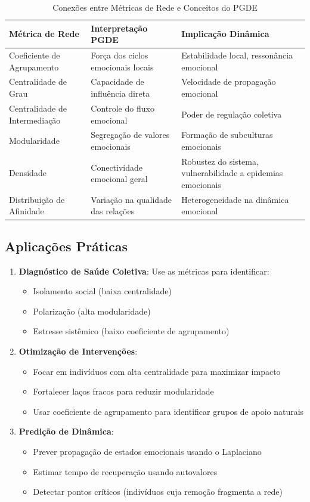 \documentclass[12pt, a4paper]{article}
\begin{document}
\begin{table}[H]
\centering
\caption{Conexões entre Métricas de Rede e Conceitos do PGDE}
\begin{tabular}{p{4cm}p{5cm}p{5cm}}
\toprule
\textbf{Métrica de Rede} & \textbf{Interpretação PGDE} & \textbf{Implicação Dinâmica} \\
\midrule
Coeficiente de Agrupamento & Força dos ciclos emocionais locais & Estabilidade local, ressonância emocional \\
Centralidade de Grau & Capacidade de influência direta & Velocidade de propagação emocional \\
Centralidade de Intermediação & Controle do fluxo emocional & Poder de regulação coletiva \\
Modularidade & Segregação de valores emocionais & Formação de subculturas emocionais \\
Densidade & Conectividade emocional geral & Robustez do sistema, vulnerabilidade a epidemias emocionais \\
Distribuição de Afinidade & Variação na qualidade das relações & Heterogeneidade na dinâmica emocional \\
\bottomrule
\end{tabular}
\end{table}

\subsection{Aplicações Práticas}

\begin{enumerate}
\item \textbf{Diagnóstico de Saúde Coletiva}: Use as métricas para identificar:
   \begin{itemize}
   \item Isolamento social (baixa centralidade)
   \item Polarização (alta modularidade)
   \item Estresse sistêmico (baixo coeficiente de agrupamento)
   \end{itemize}

\item \textbf{Otimização de Intervenções}:
   \begin{itemize}
   \item Focar em indivíduos com alta centralidade para maximizar impacto
   \item Fortalecer laços fracos para reduzir modularidade
   \item Usar coeficiente de agrupamento para identificar grupos de apoio naturais
   \end{itemize}

\item \textbf{Predição de Dinâmica}:
   \begin{itemize}
   \item Prever propagação de estados emocionais usando o Laplaciano
   \item Estimar tempo de recuperação usando autovalores
   \item Detectar pontos críticos (indivíduos cuja remoção fragmenta a rede)
   \end{itemize}
\end{enumerate}
\end{document}
